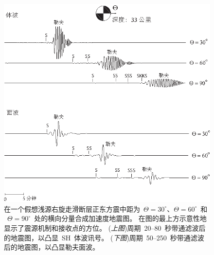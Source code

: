 \begin{figure}[!b]
\begin{center}
\includegraphics{../figures/chap10/fig10.eps}
\end{center}
\caption[seismogram1]{
\label{fig:10.11}
在一个假想浅源右旋走滑断层正东方震中距为~$\Theta=30^\circ$、$\Theta=60^\circ$~和 ~$\Theta=90^\circ$~处的横向分量合成加速度地震图。
在图的最上方示意性地显示了震源机制和接收点的方位。
({\em 上图\/})周期~20--80~秒带通滤波后的地震图，以凸显~SH~体波讯号。 
({\em 下图\/})周期~50--250~秒带通滤波后的地震图，以凸显勒夫面波。}
\end{figure}

